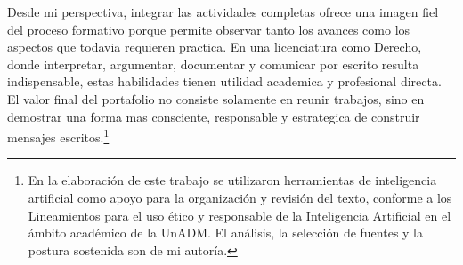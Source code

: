 \documentclass[
	spanish,
	letterpaper, oneside
]{article}
\begin{document}
Desde mi perspectiva, integrar las actividades completas ofrece una imagen fiel del proceso formativo porque permite observar tanto los avances como los aspectos que todavia requieren practica. En una licenciatura como Derecho, donde interpretar, argumentar, documentar y comunicar por escrito resulta indispensable, estas habilidades tienen utilidad academica y profesional directa. El valor final del portafolio no consiste solamente en reunir trabajos, sino en demostrar una forma mas consciente, responsable y estrategica de construir mensajes escritos.\footnote{En la elaboración de este trabajo se utilizaron herramientas de inteligencia artificial como apoyo para la organización y revisión del texto, conforme a los Lineamientos para el uso ético y responsable de la Inteligencia Artificial en el ámbito académico de la UnADM. El análisis, la selección de fuentes y la postura sostenida son de mi autoría.}


\clearpage


\end{document}

